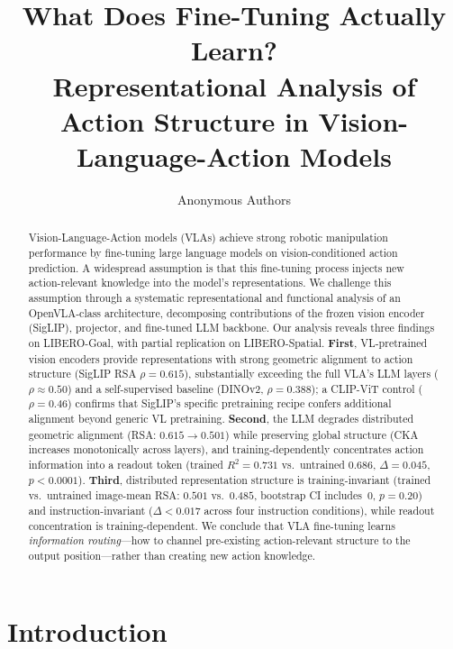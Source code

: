 \documentclass[letterpaper]{article}
\title{What Does Fine-Tuning Actually Learn? \\Representational Analysis of Action Structure in Vision-Language-Action Models}
\author{
  Anonymous Authors
}
\date{}
\begin{document}
\maketitle

\begin{abstract}
Vision-Language-Action models (VLAs) achieve strong robotic manipulation performance by fine-tuning large language models on vision-conditioned action prediction.
A widespread assumption is that this fine-tuning process injects new action-relevant knowledge into the model's representations.
We challenge this assumption through a systematic representational and functional analysis of an OpenVLA-class architecture, decomposing contributions of the frozen vision encoder (SigLIP), projector, and fine-tuned LLM backbone.
Our analysis reveals three findings on LIBERO-Goal, with partial replication on LIBERO-Spatial.
\textbf{First}, VL-pretrained vision encoders provide representations with strong geometric alignment to action structure (SigLIP RSA $\rho{=}0.615$), substantially exceeding the full VLA's LLM layers ($\rho{\approx}0.50$) and a self-supervised baseline (DINOv2, $\rho{=}0.388$); a CLIP-ViT control ($\rho{=}0.46$) confirms that SigLIP's specific pretraining recipe confers additional alignment beyond generic VL pretraining.
\textbf{Second}, the LLM degrades distributed geometric alignment (RSA: $0.615 {\to} 0.501$) while preserving global structure (CKA increases monotonically across layers), and training-dependently concentrates action information into a readout token (trained $R^2{=}0.731$ vs.\ untrained $0.686$, $\Delta{=}0.045$, $p{<}0.0001$).
\textbf{Third}, distributed representation structure is training-invariant (trained vs.\ untrained image-mean RSA: $0.501$ vs.\ $0.485$, bootstrap CI includes~0, $p{=}0.20$) and instruction-invariant ($\Delta{<}0.017$ across four instruction conditions), while readout concentration is training-dependent.
We conclude that VLA fine-tuning learns \emph{information routing}---how to channel pre-existing action-relevant structure to the output position---rather than creating new action knowledge.
\end{abstract}

\section{Introduction}
\end{document}
